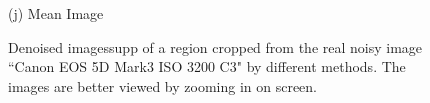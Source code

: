 \documentclass[10pt,onecolumn,letterpaper]{article}
\begin{document}
\begin{figure}[H]
{\begin{minipage}[t]{0.195\textwidth}
{\footnotesize (j) Mean Image \cite{crosschannel2016} }
\end{minipage}
}
\caption{Denoised imagessupp of a region cropped from the real noisy image ``Canon EOS 5D Mark3 ISO 3200 C3" \cite{crosschannel2016} by different methods. The images are better viewed by zooming in on screen.} 
\label{fig11}
\end{figure}

\begin{figure}[H]\vspace{1mm}
\centering
{}
\end{figure}
\end{document}
